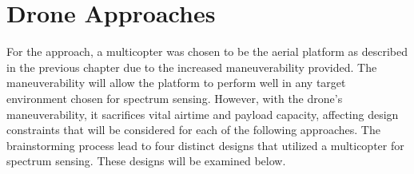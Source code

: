 

\section{Drone Approaches}
For the approach, a multicopter was chosen to be the aerial platform as described in the previous chapter due to the increased maneuverability provided. The maneuverability will allow the platform to perform well in any target environment chosen for spectrum sensing. However, with the drone’s maneuverability, it sacrifices vital airtime and payload capacity, affecting design constraints that will be considered for each of the following approaches. The brainstorming process lead to four distinct designs that utilized a multicopter for spectrum sensing. These designs will be examined below.

